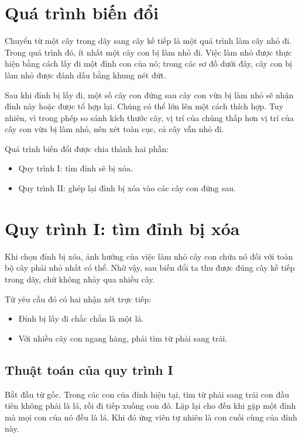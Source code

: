 \documentclass[11pt]{article}
\begin{document}
\section{Quá trình biến đổi}

Chuyển từ một cây trong dãy sang cây kế tiếp là một quá trình làm cây nhỏ đi.
Trong quá trình đó, ít nhất một cây con bị làm nhỏ đi. Việc làm nhỏ được thực
hiện bằng cách lấy đi một đỉnh con của nó; trong các sơ đồ dưới đây, cây con
bị làm nhỏ được đánh dấu bằng khung nét đứt.

Sau khi đỉnh bị lấy đi, một số cây con đứng sau cây con vừa bị làm nhỏ sẽ nhận
đỉnh này hoặc được tổ hợp lại. Chúng có thể lớn lên một cách thích hợp. Tuy
nhiên, vì trong phép so sánh kích thước cây, vị trí của chúng thấp hơn vị trí
của cây con vừa bị làm nhỏ, nên xét toàn cục, cả cây vẫn nhỏ đi.

Quá trình biến đổi được chia thành hai phần:
\begin{itemize}
  \item Quy trình I: tìm đỉnh sẽ bị xóa.
  \item Quy trình II: ghép lại đỉnh bị xóa vào các cây con đứng sau.
\end{itemize}

\section{Quy trình I: tìm đỉnh bị xóa}

Khi chọn đỉnh bị xóa, ảnh hưởng của việc làm nhỏ cây con chứa nó đối với toàn
bộ cây phải nhỏ nhất có thể. Nhờ vậy, sau biến đổi ta thu được đúng cây kề
tiếp trong dãy, chứ không nhảy qua nhiều cây.

Từ yêu cầu đó có hai nhận xét trực tiếp:
\begin{itemize}
  \item Đỉnh bị lấy đi chắc chắn là một lá.
  \item Với nhiều cây con ngang hàng, phải tìm từ phải sang trái.
\end{itemize}

\subsection{Thuật toán của quy trình I}

Bắt đầu từ gốc. Trong các con của đỉnh hiện tại, tìm từ phải sang trái con đầu
tiên không phải là lá, rồi đi tiếp xuống con đó. Lặp lại cho đến khi gặp một
đỉnh mà mọi con của nó đều là lá. Khi đó ứng viên tự nhiên là con cuối cùng
của đỉnh này.
\end{document}
